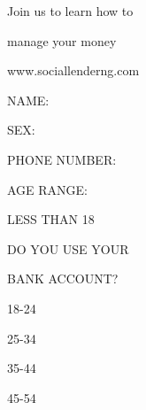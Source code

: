 \documentclass[a4paper,portrait,12pt]{article}
\begin{document}
\begin{flushleft}
Join us to learn how to
\end{flushleft}


\begin{flushleft}
manage your money
\end{flushleft}





\begin{flushleft}
www.sociallenderng.com
\end{flushleft}





\begin{flushleft}
NAME:
\end{flushleft}


\begin{flushleft}
SEX:
\end{flushleft}





\begin{flushleft}
PHONE NUMBER:
\end{flushleft}


\begin{flushleft}
AGE RANGE:
\end{flushleft}





\begin{flushleft}
LESS THAN 18
\end{flushleft}





\begin{flushleft}
DO YOU USE YOUR
\end{flushleft}


\begin{flushleft}
BANK ACCOUNT?
\end{flushleft}





18-24





25-34





35-44





45-54
\end{document}
